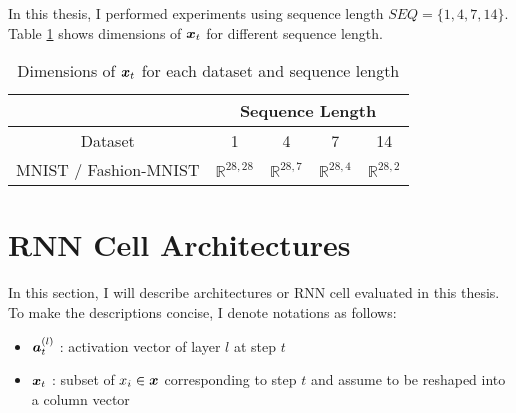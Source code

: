  
 In this thesis, I performed experiments  using sequence length $ SEQ = \{1, 4, 7, 14\}$.
Table \ref{tab:seq-length} shows dimensions of $\patvector{x}_t$ for different sequence length.

\renewcommand{\arraystretch}{1.5}
\begin{table}[h]
\centering
\begin{tabular}{l|l|l|l|l|}
\cline{2-5}
                                            & \multicolumn{4}{c|}{Sequence Length}                                                               \\ \hline
\multicolumn{1}{|c|}{Dataset}               & \multicolumn{1}{c|}{1} & \multicolumn{1}{c|}{4} & \multicolumn{1}{c|}{7} & \multicolumn{1}{c|}{14} \\ \hline
\multicolumn{1}{|l|}{MNIST / Fashion-MNIST} &        $ \mathbb{R}^{28,28}  $              &          $ \mathbb{R}^{28,7}  $               &         $ \mathbb{R}^{28,4}  $               &          $ \mathbb{R}^{28,2}  $               \\ \hline
\end{tabular}
\caption{Dimensions of $\patvector{x}_t$ for each dataset and sequence length}
\label{tab:seq-length}

\end{table}
\renewcommand{\arraystretch}{1}


\section{RNN Cell Architectures}
In this section, I will describe architectures or RNN cell evaluated in this thesis.  To make the descriptions concise, I denote notations as follows: 

\begin{itemize}
	\item $\patvector{a}_{t}^{(l)}$ : activation vector of layer $l$ at step $t$
	\item $\patvector{x}_t$ : subset of $x_i \in \patvector{x}$ corresponding to step $t$ and assume to be reshaped into a column vector
\end{itemize}

